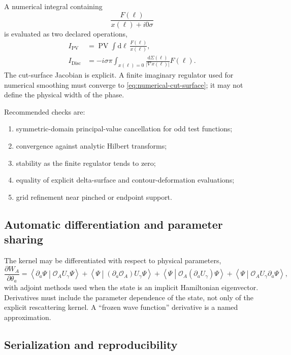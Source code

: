 \documentclass[11pt]{article}
\newcommand{\dd}{\mathrm{d}}
\newcommand{\Disc}{\operatorname{Disc}}
\newcommand{\PV}{\operatorname{PV}}
\newcommand{\cO}{\mathcal O}
\newcommand{\inner}[2]{\left\langle #1\middle|#2\right\rangle}
\begin{document}
A numerical integral containing
\begin{equation}
 \frac{F(\ell)}{x(\ell)+i0\sigma}
\label{eq:numerical-singular-integral}
\end{equation}
is evaluated as two declared operations,
\begin{align}
 I_{\PV}
 &=\PV\int\dd\ell\,\frac{F(\ell)}{x(\ell)},
\label{eq:numerical-pv}\\
 I_{\Disc}
 &=-i\sigma\pi
   \int_{x(\ell)=0}
   \frac{\dd\Sigma(\ell)}{|\nabla x(\ell)|}
   F(\ell).
\label{eq:numerical-cut-surface}
\end{align}
The cut-surface Jacobian is explicit.  A finite imaginary regulator used for
numerical smoothing must converge to \cref{eq:numerical-cut-surface}; it may
not define the physical width of the phase.

Recommended checks are:
\begin{enumerate}
\item symmetric-domain principal-value cancellation for odd test functions;
\item convergence against analytic Hilbert transforms;
\item stability as the finite regulator tends to zero;
\item equality of explicit delta-surface and contour-deformation evaluations;
\item grid refinement near pinched or endpoint support.
\end{enumerate}

\subsection{Automatic differentiation and parameter sharing}

The kernel may be differentiated with respect to physical parameters,
\begin{equation}
 \frac{\partial W_A}{\partial\theta_a}
 =\inner{\partial_a\Psi}{\cO_A U_\gamma\Psi}
 +\inner{\Psi}{(\partial_a\cO_A)U_\gamma\Psi}
 +\inner{\Psi}{\cO_A(\partial_a U_\gamma)\Psi}
 +\inner{\Psi}{\cO_AU_\gamma\partial_a\Psi},
\label{eq:full-phase-derivative}
\end{equation}
with adjoint methods used when the state is an implicit Hamiltonian
eigenvector.  Derivatives must include the parameter dependence of the state,
not only of the explicit rescattering kernel.  A ``frozen wave function''
derivative is a named approximation.

\subsection{Serialization and reproducibility}
\end{document}
